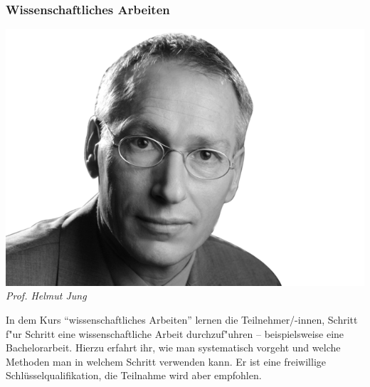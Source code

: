 \subsubsection{Wissenschaftliches Arbeiten}

\includegraphics[width=0.9\linewidth]{bilder/dozenten/jung_frei.png}\\
\textit{Prof. Helmut Jung}

In dem Kurs "`wissenschaftliches Arbeiten"' lernen die Teilnehmer/-innen, Schritt f"ur Schritt eine wissenschaftliche Arbeit durchzuf"uhren -- beispielsweise eine Bachelorarbeit.
Hierzu erfahrt ihr, wie man systematisch vorgeht und welche Methoden
man in welchem Schritt verwenden kann. Er ist eine freiwillige
Schlüsselqualifikation, die Teilnahme wird aber empfohlen.

